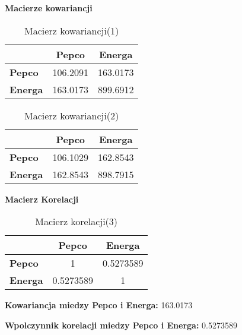 \documentclass{article}
\begin{document}
\textbf{Macierze kowariancji }

\vspace{30pt}

\begin{table}[h]
    \centering
    \begin{tabular}{lcc}
        \toprule
        & \textbf{Pepco} & \textbf{Energa} \\
        \midrule
         \textbf{Pepco} & 106.2091  & 163.0173 \\
         \textbf{Energa} & 163.0173 & 899.6912
        \bottomrule
    \end{tabular}
    \caption{Macierz kowariancji(1)}
    \label{tab:mean_vector}
\end{table}

\vspace{30pt}

\begin{table}[h]
    \centering
    \begin{tabular}{lcc}
        \toprule
        & \textbf{Pepco} & \textbf{Energa} \\
        \midrule
         \textbf{Pepco} & 106.1029 & 162.8543 \\
         \textbf{Energa} & 162.8543 & 898.7915
        \bottomrule
    \end{tabular}
    \caption{Macierz kowariancji(2)}
    \label{tab:mean_vector}
\end{table}

\newpage

\textbf{Macierz Korelacji }

\begin{table}[h]
    \centering
    \begin{tabular}{lcc}
        \toprule
        & \textbf{Pepco} & \textbf{Energa} \\
        \midrule
         \textbf{Pepco} & 1 & 0.5273589 \\
         \textbf{Energa} & 0.5273589 & 1
        \bottomrule
    \end{tabular}
    \caption{Macierz korelacji(3)}
    \label{tab:mean_vector}
\end{table}

\vspace{30pt}

\textbf{Kowariancja miedzy Pepco i Energa: } 163.0173

\vspace{30pt}

\textbf{Wpolczynnik korelacji miedzy Pepco i Energa: }0.5273589
\end{document}
